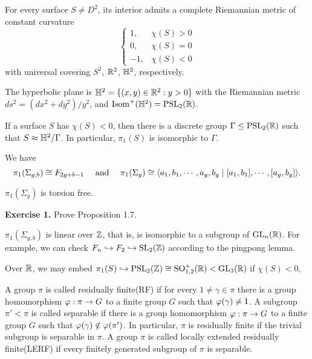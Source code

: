 \documentclass{../../../small}
\begin{document}
\begin{thm}[Uniformization]
For every surface $S\ne D^2$, its interior admits a complete Riemannian metric of constant curvature
\[\begin{cases}1,&\chi(S)>0\\0,&\chi(S)=0\\-1,&\chi(S)<0\end{cases}\]
with universal covering $S^2$, $\mathbb{R}^2$, $\mathbb{H}^2$, respectively.
\end{thm}

The hyperbolic plane is $\mathbb{H}^2=\{(x,y)\in\mathbb{R}^2:y>0\}$ with the Riemannian metric $ds^2=(dx^2+dy^2)/y^2$, and $\operatorname{Isom}^+(\mathbb{H}^2)=\mathrm{PSL}_2(\mathbb{R})$.

\begin{prop}
If a surface $S$ has $\chi(S)<0$, then there is a discrete group $\Gamma\le\mathrm{PSL}_2(\mathbb{R})$ such that $S\approx\mathbb{H}^2/\Gamma$.
In particular, $\pi_1(S)$ is isomorphic to $\Gamma$.
\end{prop}
We have
\[\pi_1(\Sigma_{g,b})\cong F_{2g+b-1}\quad\text{ and }\quad\pi_1(\Sigma_g)\cong\langle a_1,b_1,\cdots,a_g,b_g\mid[a_1,b_1],\cdots,[a_g,b_g]\rangle.\]

\begin{prop}
$\pi_1(\Sigma_g)$ is torsion free.
\end{prop}

\textbf{Exercise 1.} Prove Proposition 1.7.


\begin{thm}[Newman]
$\pi_1(\Sigma_{g,b})$ is linear over $\mathbb{Z}$, that is, is isomorphic to a subgroup of $\mathrm{GL}_n(\mathbb{R})$.
For example, we can check $F_n\hookrightarrow F_2\hookrightarrow \mathrm{SL}_2(\mathbb{Z})$ according to the pingpong lemma.
\end{thm}


Over $\mathbb{R}$, we may embed $\pi_1(S)\hookrightarrow\mathrm{PSL}_2(\mathbb{Z})\cong\mathrm{SO}_{1,2}^+(\mathbb{R})<\mathrm{GL}_3(\mathbb{R})$ if $\chi(S)<0$,

\begin{defn*}
A group $\pi$ is called residually finite(RF) if for every $1\ne\gamma\in\pi$ there is a group homomorphism $\varphi:\pi\to G$ to a finite group $G$ such that $\varphi(\gamma)\ne1$.
A subgroup $\pi'<\pi$ is called separable if there is a group homomorphism $\varphi:\pi\to G$ to a finite group $G$ such that $\varphi(\gamma)\notin\varphi(\pi')$.
In particular, $\pi$ is residually finite if the trivial subgroup is separable in $\pi$.
A group $\pi$ is called locally extended residually finite(LERF) if every finitely generated subgroup of $\pi$ is separable.
\end{defn*}
\end{document}
